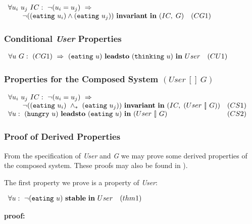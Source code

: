 \cn $\begin{array}{lllll}
 \forall u_i\ u_j\ IC:\ \neg(u_i = u_j)\ \Rightarrow\\
   \mbox{ \hspace{6mm}} \neg(({\tt eating}\ u_i) \wedge ({\tt eating}\ u_j))\
                 {\bf invariant}\ {\bf in}\ (IC,\; G) & (CG1)
\end{array}$

\subsubsection{Conditional {\it User} Properties}

\cn $\begin{array}{lllll}
 \forall u\ G:\ (CG1)\ \Rightarrow\
   ({\tt eating}\ u)\ {\bf leadsto}\ ({\tt thinking}\ u)\ {\bf in}\ User 
     & (CU1)
\end{array}$

\subsubsection{Properties for the Composed System {$(User\ [\!]\ G)$}}

\cn $\begin{array}{lllll}
 \forall u_i\ u_j\ IC:\ \neg(u_i = u_j)\ \Rightarrow\\
    \mbox{ \hspace{6mm}} \neg(({\tt eating}\ u_i)\ \wedge_*\ ({\tt eating}\ u_j))\
           {\bf invariant}\ {\bf in}\ (IC,\; (User\ [\!]\ G)) & (CS1)\\
 \forall u:\ ({\tt hungry}\ u)\ {\bf leadsto}\ ({\tt eating}\ u)\
                          {\bf in}\ (User\ [\!]\ G) & (CS2)
\end{array}$


\subsubsection{Proof of Derived Properties}

From the specification of {\it User} and {\it G} we may prove some derived
properties of the composed system.  These proofs may also be found in 
\cite{CM88}).

\medskip
The first property we prove is a property of {\it User}:

\cn $\begin{array}{lllll} \label{thm1page}
 \forall u:\ \neg({\tt eating}\ u)\ {\bf stable}\ {\bf in}\ User & (thm1)
\end{array}$

\smallskip
{\bf proof:}

